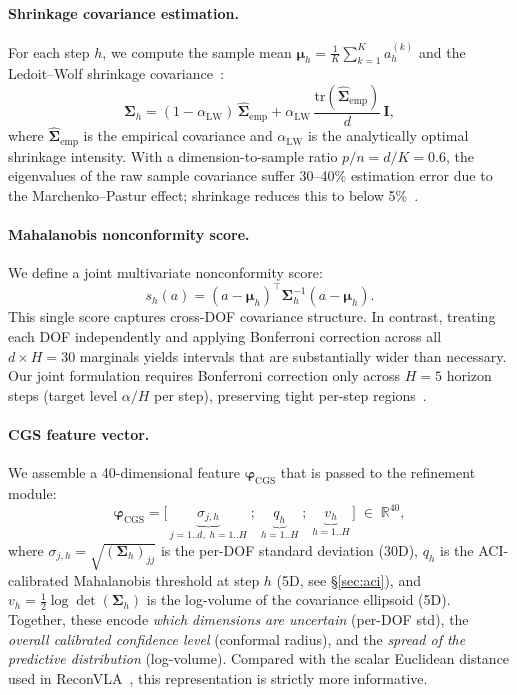 \paragraph{Shrinkage covariance estimation.}
For each step $h$, we compute the sample mean $\boldsymbol{\mu}_h = \frac{1}{K}\sum_{k=1}^K a_h^{(k)}$ and the Ledoit--Wolf shrinkage covariance~\cite{ledoit2004well}:
\begin{equation}
  \boldsymbol{\Sigma}_h = (1-\alpha_{\mathrm{LW}})\,\hat{\boldsymbol{\Sigma}}_{\mathrm{emp}} + \alpha_{\mathrm{LW}}\,\frac{\mathrm{tr}(\hat{\boldsymbol{\Sigma}}_{\mathrm{emp}})}{d}\,\mathbf{I},
  \label{eq:shrinkage}
\end{equation}
where $\hat{\boldsymbol{\Sigma}}_{\mathrm{emp}}$ is the empirical covariance and $\alpha_{\mathrm{LW}}$ is the analytically optimal shrinkage intensity.  With a dimension-to-sample ratio $p/n = d/K = 0.6$, the eigenvalues of the raw sample covariance suffer 30--40\% estimation error due to the Marchenko--Pastur effect; shrinkage reduces this to below 5\%~\cite{ledoit2004well}.

\paragraph{Mahalanobis nonconformity score.}
We define a joint multivariate nonconformity score:
\begin{equation}
  s_h(a) = (a - \boldsymbol{\mu}_h)^\top \boldsymbol{\Sigma}_h^{-1} (a - \boldsymbol{\mu}_h).
  \label{eq:mahal}
\end{equation}
This single score captures cross-DOF covariance structure.  In contrast, treating each DOF independently and applying Bonferroni correction across all $d{\times}H = 30$ marginals yields intervals that are substantially wider than necessary.  Our joint formulation requires Bonferroni correction only across $H{=}5$ horizon steps (target level $\alpha/H$ per step), preserving tight per-step regions~\cite{braun2025cgs}.

\paragraph{CGS feature vector.}
We assemble a 40-dimensional feature $\boldsymbol{\varphi}_{\mathrm{CGS}}$ that is passed to the refinement module:
\begin{equation}
  \boldsymbol{\varphi}_{\mathrm{CGS}} = \bigl[\,\underbrace{\sigma_{j,h}}_{j=1..d,\;h=1..H}\;;\;\underbrace{q_h}_{h=1..H}\;;\;\underbrace{v_h}_{h=1..H}\,\bigr] \;\in\;\mathbb{R}^{40},
  \label{eq:cgs_feat}
\end{equation}
where $\sigma_{j,h} = \sqrt{(\boldsymbol{\Sigma}_h)_{jj}}$ is the per-DOF standard deviation (30D), $q_h$ is the ACI-calibrated Mahalanobis threshold at step $h$ (5D, see \S\ref{sec:aci}), and $v_h = \tfrac{1}{2}\log\det(\boldsymbol{\Sigma}_h)$ is the log-volume of the covariance ellipsoid (5D).  Together, these encode \emph{which dimensions are uncertain} (per-DOF std), the \emph{overall calibrated confidence level} (conformal radius), and the \emph{spread of the predictive distribution} (log-volume).  Compared with the scalar Euclidean distance used in ReconVLA~\cite{reconvla2026}, this representation is strictly more informative.

